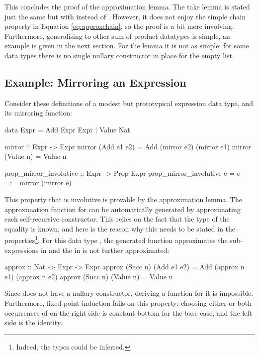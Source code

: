 This concludes the proof of the approximation lemma. The take lemma is
stated just the same but with  instead of
. However, it does not enjoy the simple chain property in
Equation \ref{eq:approxchain}, so the proof is a bit more involving.
Furthermore, generalising  to other sum of product
datatypes is simple, an example is given in the next section. For the
 lemma it is not as simple: for some data types there is no
single nullary constructor in place for the empty list.

\subsection{Example: Mirroring an Expression}

Consider these definitions of a modest but prototypical expression
data type, and its mirroring function:

\begin{code}
data Expr = Add Expr Expr | Value Nat

mirror :: Expr -> Expr
mirror (Add e1 e2) = Add (mirror e2) (mirror e1)
mirror (Value n)   = Value n

prop_mirror_involutive :: Expr -> Prop Expr
prop_mirror_involutive e = e =:= mirror (mirror e)
\end{code}

This property that  is involutive is provable by the
approximation lemma. The approximation function for  can be
automatically generated by approximating each self-recursive
constructor. This relies on the fact that the type of the equality is
known, and here is the reason why this needs to be stated in the
properties\footnote{Indeed, the types could be inferred.}. For this
data type , the generated function approximates the
sub-expressions in  and the  in  is not
further approximated:

\begin{code}
approx :: Nat -> Expr -> Expr
approx (Succ n) (Add e1 e2) = Add (approx n e1) (approx n e2)
approx (Succ n) (Value n)   = Value n
\end{code}

Since  does not have a nullary constructor, deriving a
 function for it is impossible. Furthermore, fixed point
induction fails on this property: choosing either or both occurrences
of  on the right side is constant bottom for the base case,
and the left side is the identity.


